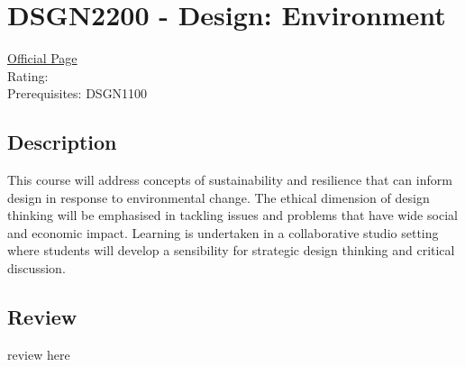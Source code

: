 \hypertarget{DSGN2200}{\section{DSGN2200 - Design: Environment}}

\large
\textcolor{turbo_purple}{\href{https://my.uq.edu.au/programs-courses/course.html?course_code=DSGN2200}{Official Page}} \\
Rating: \cstar\cstar\cstar\cstar\ostar \\
Prerequisites: DSGN1100

\normalsize
\subsection*{Description}
This course will address concepts of sustainability and resilience that can inform design in response to environmental change.
The ethical dimension of design thinking will be emphasised in tackling issues and problems that have wide social and economic impact.
Learning is undertaken in a collaborative studio setting where students will develop a sensibility for strategic design thinking and critical discussion.

\subsection*{Review}
review here
